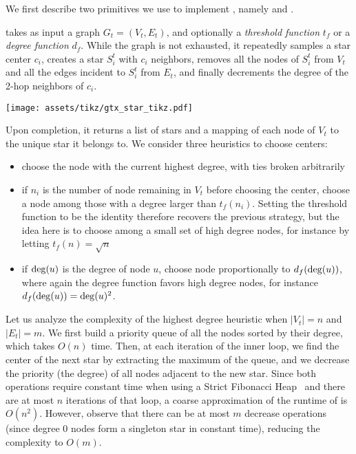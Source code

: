 We first describe two primitives we use to implement \gtx{}, namely \extractStar{} and
\collapseStar{}.

\extractStar{} takes as input a graph $G_t=(V_t, E_t)$, and optionally a \emph{threshold function}
$t_f$ or a \emph{degree function} $d_f$. While the graph is not exhausted, it repeatedly samples a
star center $c_i$, creates a star $S_i^t$ with $c_i$ neighbors, removes all the nodes of $S_i^t$ from
$V_t$ and all the edges incident to $S_i^t$ from $E_t$, and finally decrements the degree of the 2-hop
neighbors of $c_i$.
\begin{marginfigure}
  \centering
  \texttt{[image: assets/tikz/gtx\_star\_tikz.pdf]}
  \caption[A sample star]{A sample star created at the $t^\mathrm{th}$ level. The black node
    is the center $c_i$ of the star $S_i^t$, which is made of the four light gray peripheral nodes
  as well as the solid edges. The 2-hops neighbors of $c_i$ are the white nodes
  $h_1$ to $h_3$, whose degree will decrease once we $S_i^t$ is removed from $G_t$.}
  \label{fig:gtx_star_simple}
\end{marginfigure}
Upon completion, it returns a list of stars and a mapping of
each node of $V_t$ to the unique star it belongs to. We consider three heuristics to choose centers:

\begin{itemize}
  \item choose the node with the current highest degree, with ties broken arbitrarily
  \item if $n_i$ is the number of node remaining in $V_t$ before choosing the \ith{} center, choose
    a node \uar{} among those with a degree larger than $t_f(n_i)$. Setting the threshold function
    to be the identity therefore recovers the previous strategy, but the idea here is to choose
    among a small set of high degree nodes, for instance by letting $t_f(n) = \sqrt{n}$
  \item if $\operatorname{deg}(u)$ is the degree of node $u$, choose node proportionally to $d_f(\operatorname{deg}(u))$, where
    again the degree function favors high degree nodes, for instance $d_f(\operatorname{deg}(u)) = \operatorname{deg}(u)^2$.
\end{itemize}

Let us analyze the complexity of the highest degree heuristic when $|V_t|=n$ and $|E_t|=m$. We first
build a priority queue of all the nodes sorted by their degree, which takes $O(n)$ time.  Then, at
each iteration of the inner loop, we find the center of the next star by extracting the maximum of
the queue, and we decrease the priority (\ie the degree) of all nodes adjacent to the new star.
Since both operations require constant time when using a Strict Fibonacci
Heap~\autocite{FibonacciHeaps12} and there are at most $n$ iterations of that loop, a coarse
approximation of the runtime of \extractStar{} is $O(n^2)$. However, observe that there can be at
most $m$ decrease operations (since degree $0$ nodes form a singleton star in constant time),
reducing the complexity to $O(m)$.

